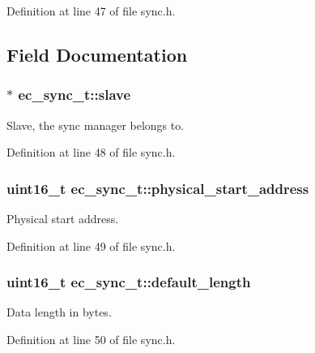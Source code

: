 Definition at line 47 of file sync.\-h.



\subsection{Field Documentation}
\subsubsection[{slave}]{$\ast$ ec\-\_\-sync\-\_\-t\-::slave}\label{structec__sync__t_a76825f16d6c2d649740045b5a0c96a26}


Slave, the sync manager belongs to. 



Definition at line 48 of file sync.\-h.

\subsubsection[{physical\-\_\-start\-\_\-address}]{\setlength{\rightskip}{0pt plus 5cm}uint16\-\_\-t ec\-\_\-sync\-\_\-t\-::physical\-\_\-start\-\_\-address}\label{structec__sync__t_a35017ae8615f6eee4ecb5ed044501184}


Physical start address. 



Definition at line 49 of file sync.\-h.

\subsubsection[{default\-\_\-length}]{\setlength{\rightskip}{0pt plus 5cm}uint16\-\_\-t ec\-\_\-sync\-\_\-t\-::default\-\_\-length}\label{structec__sync__t_ade13d88d878f5e87763c34b636a4c1a1}


Data length in bytes. 



Definition at line 50 of file sync.\-h.

